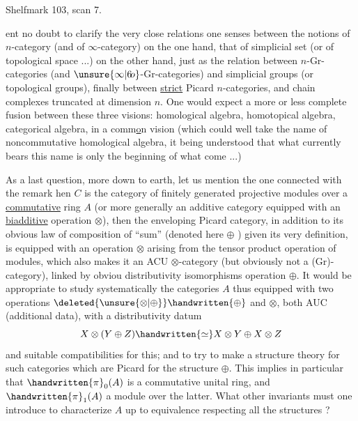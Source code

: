 Shelfmark 103, scan 7.


ent no doubt to clarify the very close relations one senses between the notions of $n$-category (and of $\infty$-category) on the one hand, that of simplicial set (or of topological space ...) on the other hand, just as the relation between $n$-Gr-categories (and $\unsure{\infty|6\!o}$-Gr-categories) and simplicial groups (or topological groups), finally between   \uline{strict} Picard $n$-categories, and  chain complexes truncated at dimension $n$. One would expect a more or less complete fusion between these three visions: homological algebra, homotopical algebra, categorical algebra, in a comm\uline{o}n vision (which could well take the name of noncommutative homological algebra, it being understood that what currently bears this name is only the beginning of what   come ...)

As a last question, more down to earth, let us mention the one connected with the remark   hen  $C$ is the category of finitely generated projective modules over a \uline{commutative} ring $A$ (or more generally an additive category equipped with an   \uline{biadditive} operation $\otimes$), then the enveloping Picard category, in addition to its obvious law of composition of ``sum'' (denoted here $\oplus$ ) given   its very definition, is equipped with an operation $\otimes$ arising from the  tensor product operation of  modules, which also makes it an ACU $\otimes$-category (but obviously not a (Gr)-category), linked by obviou distributivity isomorphisms   operation $\oplus$. It would be appropriate to study systematically the categories $A$ thus equipped with two operations $\deleted{\unsure{\otimes|\oplus}}\handwritten{\oplus}$ and $\otimes$, both AUC (additional data), with a distributivity datum
\[
X\otimes(Y\oplus Z)\handwritten{\simeq}X\otimes Y\oplus X\otimes Z
\]
and suitable compatibilities for this; and to try to make a structure theory for such categories which are  Picard for the structure $\oplus$. This implies in particular that $\handwritten{\pi}_{0}(A)$ is a commutative unital ring, and $\handwritten{\pi}_{1}(A)$ a module over the latter. What other invariants must one introduce to characterize $A$ up to equivalence respecting all the structures ?

